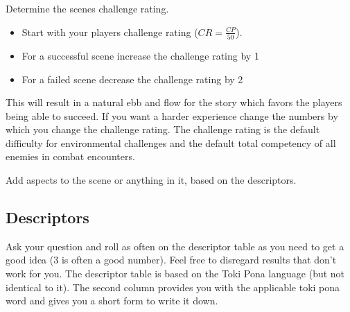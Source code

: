 \documentclass[11pt]{article}
\begin{document}
{Determine the scenes challenge rating.
\begin{itemize}
\item Start with your players challenge rating (\(CR = \frac{CP}{50}\)).
\item For a successful scene increase the challenge rating by 1
\item For a failed scene decrease the challenge rating by 2
\end{itemize}

This will result in a natural ebb and flow for the story which favors the players being able to succeed. If you want a harder experience change the numbers by which you change the challenge rating. 
The challenge rating is the default difficulty for environmental challenges and the default total competency of all enemies in combat encounters.

Add aspects to the scene or anything in it, based on the descriptors.
\subsection{Descriptors}
\label{sec:org675937c}

Ask your question and roll as often on the descriptor table as you need to get a good idea (3 is often a good number). Feel free to disregard results that don't work for you.
The descriptor table is based on the Toki Pona language (but not identical to it). The second column provides you with the applicable toki pona word and gives you a short form to write it down. 
}
\end{document}

